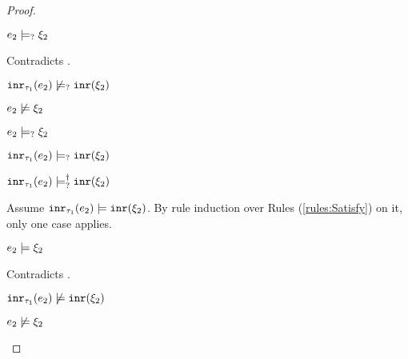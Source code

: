 \begin{proof}
\begin{byCases}
\begin{byCases}
\begin{byCases}
\begin{byCases}
                \begin{pfsteps*}
                \item $e_2 \models_{?} \xi_2$
                \end{pfsteps*}
                Contradicts .
            \end{byCases}
            \begin{pfsteps*}
            \item $\mathtt{inr}_{\tau_1}({e_2}) \not\models_{?} \mathtt{inr}(\xi_2)$ 
            \end{pfsteps*}
        \item[\cmaysatisfy{e_2}{\xi_2}]
            \begin{pfsteps*}
            \item $e_2 \not\models \xi_2$  
            \item $e_2 \models_{?} \xi_2$  
            \item $\mathtt{inr}_{\tau_1}({e_2}) \models_{?} \mathtt{inr}(\xi_2)$  
            \item $\mathtt{inr}_{\tau_1}({e_2}) \models_{?}^{\dag} \mathtt{inr}(\xi_2)$ 
            \end{pfsteps*}
            Assume $\mathtt{inr}_{\tau_1}({e_2}) \models \mathtt{inr}(\xi_2)$. By rule induction over Rules (\ref{rules:Satisfy}) on it, only one case applies.
            \begin{byCases}
            \item[\text{(\ref{rule:CSInr})}]
                \begin{pfsteps*}
                \item $e_2 \models \xi_2$
                \end{pfsteps*}
                Contradicts .
            \end{byCases}
            \begin{pfsteps*}
            \item $\mathtt{inr}_{\tau_1}({e_2}) \not\models \mathtt{inr}(\xi_2)$ 
            \end{pfsteps*}
        \item[\cnotsatisfyormay{e_2}{\xi_2}]
            \begin{pfsteps*}
            \item $e_2 \not\models \xi_2$  

\end{pfsteps*}
\end{byCases}
\end{byCases}
\end{byCases}
\end{proof}
